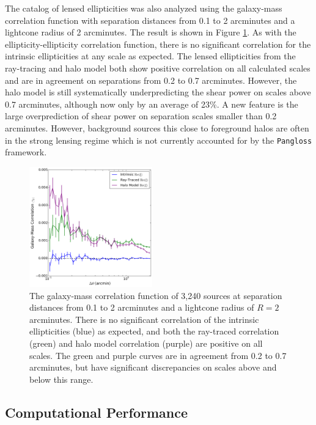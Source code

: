 \documentclass[%
 reprint,
 amsmath,amssymb,
 aps,nofootinbib
]{revtex4-1}
\begin{document}
The catalog of lensed ellipticities was also analyzed using the galaxy-mass correlation function with separation distances from 0.1 to 2 arcminutes and a lightcone radius of 2 arcminutes. The result is shown in Figure \ref{ng_corr}. As with the ellipticity-ellipticity correlation function, there is no significant correlation for the intrinsic ellipticities at any scale as expected. The lensed ellipticities from the ray-tracing and halo model both show positive correlation on all calculated scales and are in agreement on separations from 0.2 to 0.7 arcminutes. However, the halo model is still systematically underpredicting the shear power on scales above 0.7 arcminutes, although now only by an average of 23\%. A new feature is the large overprediction of shear power on separation scales smaller than 0.2 arcminutes. However, background sources this close to foreground halos are often in the strong lensing regime which is not currently accounted for by the \texttt{Pangloss} framework.

\begin{figure}
    \centering
    \includegraphics[width=0.475\textwidth]{figs-swe/ng_corr.png}
    \captionsetup{justification=raggedright,singlelinecheck=false}
    \caption{The galaxy-mass correlation function of 3,240 sources at separation distances from 0.1 to 2 arcminutes and a lightcone radius of $R=2$ arcminutes. There is no significant correlation of the intrinsic ellipticities (blue) as expected, and both the ray-traced correlation (green) and halo model correlation (purple) are positive on all scales. The green and purple curves are in agreement from 0.2 to 0.7 arcminutes, but have significant discrepancies on scales above and below this range.}
    \label{ng_corr}
\end{figure}

\subsection*{Computational Performance}
\end{document}
